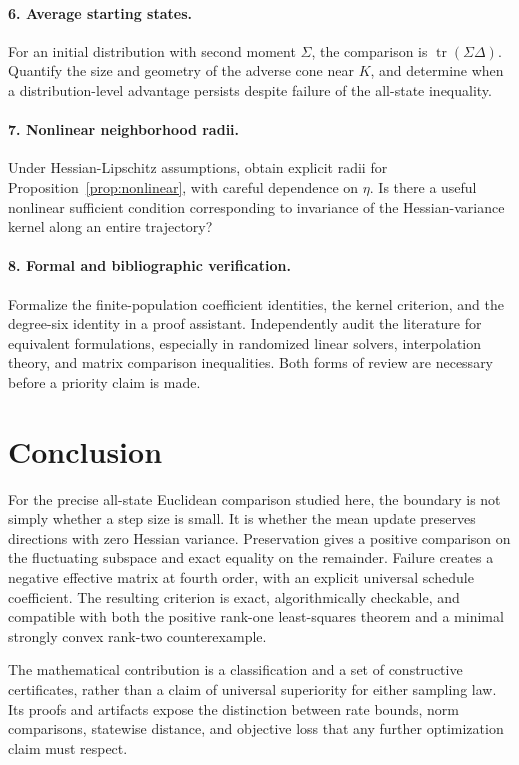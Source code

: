 \documentclass[11pt,letterpaper]{article}
\numberwithin{equation}{section}
\theoremstyle{definition}
\newcommand{\tr}{\operatorname{tr}}
\begin{document}
\paragraph{6. Average starting states.}
For an initial distribution with second moment $\Sigma$, the comparison is $\tr(\Sigma\Delta)$. Quantify the size and geometry of the adverse cone near $K$, and determine when a distribution-level advantage persists despite failure of the all-state inequality.

\paragraph{7. Nonlinear neighborhood radii.}
Under Hessian-Lipschitz assumptions, obtain explicit radii for Proposition~\ref{prop:nonlinear}, with careful dependence on $\eta$. Is there a useful nonlinear sufficient condition corresponding to invariance of the Hessian-variance kernel along an entire trajectory?

\paragraph{8. Formal and bibliographic verification.}
Formalize the finite-population coefficient identities, the kernel criterion, and the degree-six identity in a proof assistant. Independently audit the literature for equivalent formulations, especially in randomized linear solvers, interpolation theory, and matrix comparison inequalities. Both forms of review are necessary before a priority claim is made.

\section{Conclusion}

For the precise all-state Euclidean comparison studied here, the boundary is not simply whether a step size is small. It is whether the mean update preserves directions with zero Hessian variance. Preservation gives a positive comparison on the fluctuating subspace and exact equality on the remainder. Failure creates a negative effective matrix at fourth order, with an explicit universal schedule coefficient. The resulting criterion is exact, algorithmically checkable, and compatible with both the positive rank-one least-squares theorem and a minimal strongly convex rank-two counterexample.

The mathematical contribution is a classification and a set of constructive certificates, rather than a claim of universal superiority for either sampling law. Its proofs and artifacts expose the distinction between rate bounds, norm comparisons, statewise distance, and objective loss that any further optimization claim must respect.
\end{document}
